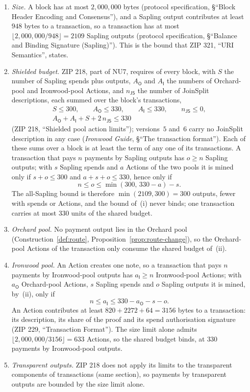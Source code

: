 \documentclass[11pt,a4paper]{article}
\theoremstyle{definition}
\begin{document}
\begin{enumerate}[label=(\roman*)]
\item \emph{Size.} A block has at most $2{,}000{,}000$ bytes (protocol
  specification, \S``Block Header Encoding and Consensus''), and a Sapling
  output contributes at least $948$ bytes to a transaction, so a
  transaction has at most $\lfloor 2{,}000{,}000 / 948 \rfloor = 2109$
  Sapling outputs (protocol specification, \S``Balance and Binding
  Signature (Sapling)''). This is the bound that ZIP 321, ``URI
  Semantics'', states.
\item \emph{Shielded budget.} ZIP 218, part of NU7, requires of every
  block, with $S$ the number of Sapling spends plus outputs,
  $A_{\mathsf{O}}$ and $A_{\mathsf{I}}$ the numbers of Orchard-pool and
  Ironwood-pool Actions, and $n_{\mathsf{JS}}$ the number of JoinSplit
  descriptions, each summed over the block's transactions,
  \begin{gather*}
    S \le 300, \qquad A_{\mathsf{O}} \le 330, \qquad
    A_{\mathsf{I}} \le 330, \qquad n_{\mathsf{JS}} \le 0, \\
    A_{\mathsf{O}} + A_{\mathsf{I}} + S + 2\, n_{\mathsf{JS}} \le 330
  \end{gather*}
  (ZIP 218, ``Shielded pool action limits''); versions~$5$ and~$6$ carry
  no JoinSplit description in any case (\emph{Ironwood Guide},
  \S``The transaction format''). Each of these sums over a block is at
  least the term of any one of its transactions. A transaction that pays
  $n$ payments by Sapling outputs has $o \ge n$ Sapling outputs; with $s$
  Sapling spends and $a$ Actions of the two pools it is mined only if
  $s + o \le 300$ and $a + s + o \le 330$, hence only if
  \[
    n \le o \le \min(300,\, 330 - a) - s .
  \]
  The all-Sapling bound is therefore $\min(2109, 300) = 300$ outputs, fewer
  with spends or Actions, and the bound of~(i) never binds; one
  transaction carries at most $330$ units of the shared budget.
\item \emph{Orchard pool.} No payment output lies in the Orchard pool
  (Construction~\ref{def:route}, Proposition~\ref{prop:route-change}), so
  the Orchard-pool Actions of the transaction only consume the shared
  budget of~(ii).
\item \emph{Ironwood pool.} An Action creates one note, so a transaction
  that pays $n$ payments by Ironwood-pool outputs has $a_{\mathsf{I}} \ge
  n$ Ironwood-pool Actions; with $a_{\mathsf{O}}$ Orchard-pool Actions, $s$
  Sapling spends and $o$ Sapling outputs it is mined, by~(ii), only if
  \[
    n \le a_{\mathsf{I}} \le 330 - a_{\mathsf{O}} - s - o .
  \]
  An Action contributes at least $820 + 2272 + 64 = 3156$ bytes to a
  transaction: its description, its share of the proof and its spend
  authorisation signature (ZIP 229, ``Transaction Format''). The size limit
  alone admits $\lfloor 2{,}000{,}000 / 3156 \rfloor = 633$ Actions, so the
  shared budget binds, at $330$ payments by Ironwood-pool outputs.
\item \emph{Transparent outputs.} ZIP 218 does not apply its limits to the
  transparent components of transactions (same section), so payments by
  transparent outputs are bounded by the size limit alone.
\end{enumerate}
\end{document}
